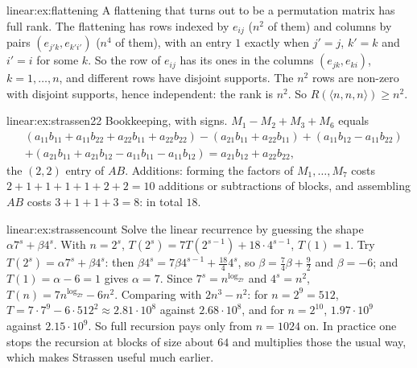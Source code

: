 \begin{solution}{linear:ex:flattening}
\idea A flattening that turns out to be a permutation matrix has full rank.
\writeup The flattening has rows indexed by $e_{ij}$ ($n^2$ of them) and columns by pairs $(e_{j'k},e_{k'i'})$ ($n^4$ of them), with an
entry $1$ exactly when $j'=j$, $k'=k$ and $i'=i$ for some $k$. So the row of $e_{ij}$ has its ones in the columns $(e_{jk},e_{ki})$,
$k=1,\dots,n$, and different rows have disjoint supports. The $n^2$ rows are non-zero with disjoint supports, hence independent:
the rank is $n^2$. So $R(\langle n,n,n\rangle)\ge n^2$.
\end{solution}

\begin{solution}{linear:ex:strassen22}
\idea Bookkeeping, with signs.
\writeup $M_1-M_2+M_3+M_6$ equals
\[
\begin{aligned}
&(a_{11}b_{11}+a_{11}b_{22}+a_{22}b_{11}+a_{22}b_{22})-(a_{21}b_{11}+a_{22}b_{11})+(a_{11}b_{12}-a_{11}b_{22})\\
&+(a_{21}b_{11}+a_{21}b_{12}-a_{11}b_{11}-a_{11}b_{12})=a_{21}b_{12}+a_{22}b_{22},
\end{aligned}
\]
the $(2,2)$ entry of $AB$. Additions: forming the factors of $M_1,\dots,M_7$ costs $2+1+1+1+1+2+2=10$ additions or subtractions of
blocks, and assembling $AB$ costs $3+1+1+3=8$: in total $18$.
\end{solution}

\begin{solution}{linear:ex:strassencount}
\idea Solve the linear recurrence by guessing the shape $\alpha7^s+\beta4^s$.
\writeup With $n=2^s$, $T(2^s)=7T(2^{s-1})+18\cdot4^{s-1}$, $T(1)=1$. Try $T(2^s)=\alpha7^s+\beta4^s$: then $\beta4^s=7\beta4^{s-1}+
\frac{18}44^s$, so $\beta=\frac74\beta+\frac92$ and $\beta=-6$; and $T(1)=\alpha-6=1$ gives $\alpha=7$. Since $7^s=n^{\log_27}$ and $4^s=n^2$,
$T(n)=7n^{\log_27}-6n^2$. Comparing with $2n^3-n^2$: for $n=2^9=512$, $T=7\cdot7^9-6\cdot512^2\approx2.81\cdot10^8$ against $2.68\cdot10^8$,
and for $n=2^{10}$, $1.97\cdot10^9$ against $2.15\cdot10^9$. So full recursion pays only from $n=1024$ on. In practice one stops the
recursion at blocks of size about $64$ and multiplies those the usual way, which makes Strassen useful much earlier.
\end{solution}

